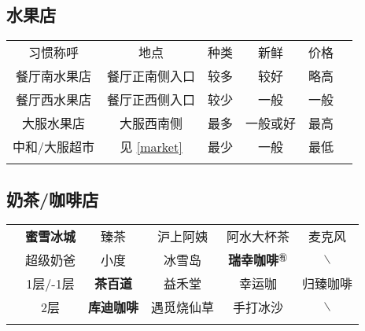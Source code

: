 \subsection[水果店]{水果店}
\begin{table}[H]
    \centering
    \begin{tabular}{|c|c|c|c|c|c|}
        \Xhline{1.2pt}
        习惯称呼    & 地点                     & 种类 & 新鲜   & 价格 \\
        \Xhline{1.2pt}
        餐厅南水果店  & 餐厅正南侧入口                & 较多 & 较好   & 略高 \\
        \hline
        餐厅西水果店  & 餐厅正西侧入口                & 较少 & 一般   & 一般 \\
        \hline
        大服水果店   & 大服西南侧                  & 最多 & 一般或好 & 最高 \\
        \hline
        中和/大服超市 & 见 \uline{\ref{market}} & 最少 & 一般   & 最低 \\
        \Xhline{1.2pt}
    \end{tabular}
\end{table}

\subsection[奶茶/咖啡店]{奶茶/咖啡店}
\begin{table}[H]
    \centering
    \begin{tabular}{|c|c|c|c|c|c|}
        \Xhline{1.2pt}
        \multirow{2}{*}{食堂} & \textbf{蜜雪冰城}       & 臻茶            & 沪上阿姨  %
                            & 阿水大杯茶               & 麦克风                   \\
        \cline{2-6}
                            & 超级奶爸                & 小度            & 冰雪岛   %
                            & \textbf{瑞幸咖啡}$^{㊒}$ & $\backslash$          \\
        \Xhline{1.2pt}
        \multirow{2}{*}{大服} & 1层/-1层              & \textbf{茶百道}  & 益禾堂   %
                            & 幸运咖                 & 归臻咖啡                  \\
        \cline{2-6}
                            & 2层                  & \textbf{库迪咖啡} & 遇觅烧仙草 %
                            & 手打冰沙                & $\backslash$          \\
        \Xhline{1.2pt}
    \end{tabular}
\end{table}

